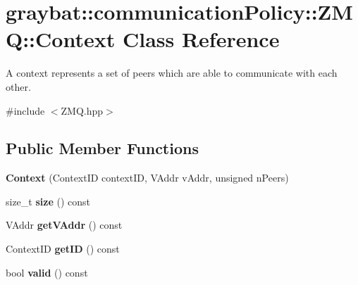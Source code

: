 \hypertarget{classgraybat_1_1communicationPolicy_1_1ZMQ_1_1Context}{}\section{graybat\+:\+:communication\+Policy\+:\+:Z\+M\+Q\+:\+:Context Class Reference}
\label{classgraybat_1_1communicationPolicy_1_1ZMQ_1_1Context}


A context represents a set of peers which are able to communicate with each other.  




{\ttfamily \#include $<$Z\+M\+Q.\+hpp$>$}

\subsection*{Public Member Functions}
\begin{DoxyCompactItemize}
\item 
\hypertarget{classgraybat_1_1communicationPolicy_1_1ZMQ_1_1Context_abfcfbe23ccee6cdec1b675145c7822c5}{}{\bfseries Context} (Context\+I\+D context\+I\+D, V\+Addr v\+Addr, unsigned n\+Peers)\label{classgraybat_1_1communicationPolicy_1_1ZMQ_1_1Context_abfcfbe23ccee6cdec1b675145c7822c5}

\item 
\hypertarget{classgraybat_1_1communicationPolicy_1_1ZMQ_1_1Context_a525e8fe1e4c16a412c3ec1dfa5021da6}{}size\+\_\+t {\bfseries size} () const \label{classgraybat_1_1communicationPolicy_1_1ZMQ_1_1Context_a525e8fe1e4c16a412c3ec1dfa5021da6}

\item 
\hypertarget{classgraybat_1_1communicationPolicy_1_1ZMQ_1_1Context_a4344fd94d2323322203918d11e1e5a87}{}V\+Addr {\bfseries get\+V\+Addr} () const \label{classgraybat_1_1communicationPolicy_1_1ZMQ_1_1Context_a4344fd94d2323322203918d11e1e5a87}

\item 
\hypertarget{classgraybat_1_1communicationPolicy_1_1ZMQ_1_1Context_a6e3c2d1223ce1383f93ddaa78403e9b8}{}Context\+I\+D {\bfseries get\+I\+D} () const \label{classgraybat_1_1communicationPolicy_1_1ZMQ_1_1Context_a6e3c2d1223ce1383f93ddaa78403e9b8}

\item 
\hypertarget{classgraybat_1_1communicationPolicy_1_1ZMQ_1_1Context_ac6170df569d1754f9156db94ab47a6ce}{}bool {\bfseries valid} () const \label{classgraybat_1_1communicationPolicy_1_1ZMQ_1_1Context_ac6170df569d1754f9156db94ab47a6ce}

\end{DoxyCompactItemize}


